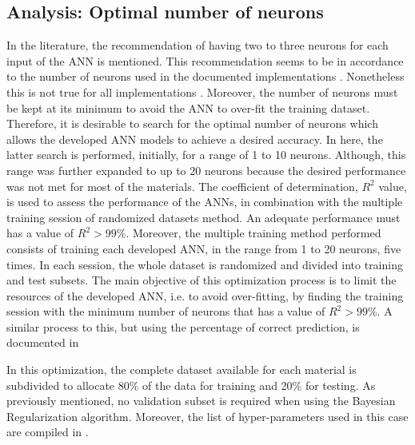 \subsection{Analysis: Optimal number of neurons}

In the literature, the recommendation of having two to three neurons for each input of the ANN is mentioned. This recommendation seems to be in accordance to the number of neurons used in the documented implementations \cite{rodriguez2019application,kopal2018prediction,jenik2017sequential}. Nonetheless this is not true for all implementations \cite{yousef2011prediction,kopal2017modeling}. Moreover, the number of neurons must be kept at its minimum to avoid the ANN to over-fit the training dataset. Therefore, it is desirable to search for the optimal number of neurons which allows the developed ANN models to achieve a desired accuracy. In here, the latter search is performed, initially, for a range of 1 to 10 neurons. Although, this range was further expanded to up to 20 neurons because the desired performance was not met for most of the materials. The coefficient of determination, $R^2$ value, is used to assess the performance of the ANNs, in combination with the multiple training session of randomized datasets method. An adequate performance must has a value of $R^2>99\%$. Moreover, the multiple training method performed consists of training each developed ANN, in the range from 1 to 20 neurons, five times. In each session, the whole dataset is randomized and divided into training and test subsets. The main objective of this optimization process is to limit the resources of the developed ANN, i.e. to avoid over-fitting, by finding the training session with the minimum number of neurons that has a value of $R^2>99\%$. A similar process to this, but using the percentage of correct prediction, is documented in \cite{zhang2002dynamic}

In this optimization, the complete dataset available for each material is subdivided to allocate 80\% of the data for training and 20\% for testing. As previously mentioned, no validation subset is required when using the Bayesian Regularization algorithm. Moreover, the list of hyper-parameters used in this case are compiled in .

